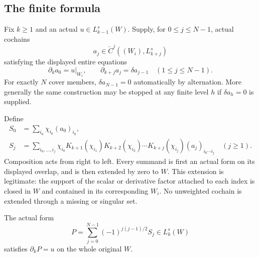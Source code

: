 \subsection{The finite formula}

Fix $k\ge1$ and an actual $u\in L_{k-1}^s(W)$.  Supply, for
$0\le j\le N-1$, actual cochains
\[
 a_j\in\check C^j((W_i),L_{k+j}^s)
 \tag{FHD6}
\]
satisfying the displayed entire equations
\[
 \partial_ka_0=u|_{W_i},\qquad
 \partial_{k+j}a_j=\delta a_{j-1}\quad(1\le j\le N-1).
 \tag{FHD7}
\]
For exactly $N$ cover members, $\delta a_{N-1}=0$ automatically
by alternation.  More generally the same construction may be
stopped at any finite level $h$ if $\delta a_h=0$ is supplied.

Define
\[
 \begin{split}
 S_0&=\sum_{i_0}\chi_{i_0}(a_0)_{i_0},\\
 S_j&=\sum_{i_0,\ldots,i_j}\chi_{i_0}
    K_{k+1}(\chi_{i_1})K_{k+2}(\chi_{i_2})\cdots
      K_{k+j}(\chi_{i_j})(a_j)_{i_0\cdots i_j}
                  \quad(j\ge1).
 \end{split}
 \tag{FHD8}
\]
Composition acts from right to left.  Every summand is first an
actual form on its displayed overlap, and is then extended by zero
to $W$.  This extension is legitimate: the support of the scalar
or derivative factor attached to each index is closed in $W$ and
contained in its corresponding $W_i$.  No unweighted cochain is
extended through a missing or singular set.

\begin{theorem}
The actual form
\[
 \boxed{\qquad
 P=\sum_{j=0}^{N-1}(-1)^{j(j-1)/2}S_j\in L_k^s(W)
                 \qquad}
 \tag{FHD9}
\]
satisfies $\partial_kP=u$ on the whole original $W$.
\end{theorem}

